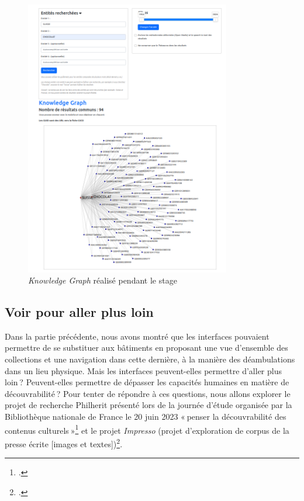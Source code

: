 \begin{figure}[h!]
	\centering
	\includegraphics[width=0.8\textwidth]{images/imageknowledge.png}
	\caption{\textit{Knowledge Graph} réalisé pendant le stage}
	\label{fig:imageknowledge}
\end{figure}


\subsection{Voir pour aller plus loin}

Dans la partie précédente, nous avons montré que les interfaces pouvaient permettre de se substituer aux bâtiments en proposant une vue d’ensemble des collections et une navigation dans cette dernière, à la manière des déambulations dans un lieu physique. Mais les interfaces peuvent-elles permettre d’aller plus loin ? Peuvent-elles permettre de dépasser les capacités humaines en matière de découvrabilité ? Pour tenter de répondre à ces questions, nous allons explorer le projet de recherche Philherit présenté lors de la journée d’étude organisée par la Bibliothèque nationale de France le 20 juin 2023 « penser la découvrabilité des contenus culturels »\footcite{plouviez_philosophie_2023} et le projet \textit{Impresso} (projet d’exploration de corpus de la presse écrite [images et textes])\footcite{noauthor_impresso_nodate}.

